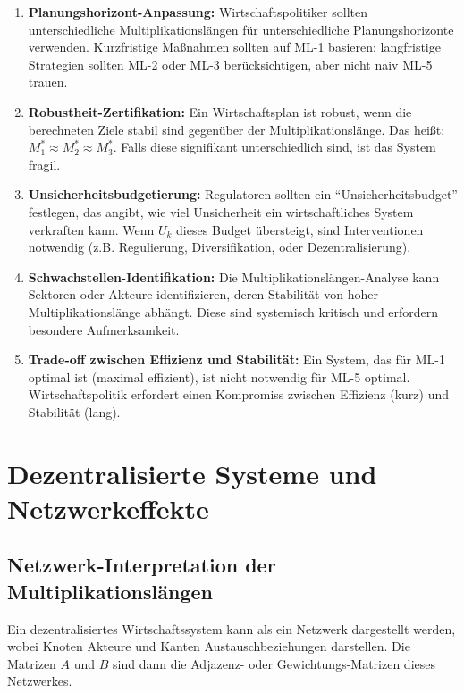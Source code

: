 \documentclass[a4paper,12pt]{article}
\theoremstyle{definition}
\begin{document}
\begin{enumerate}

\item \textbf{Planungshorizont-Anpassung:} Wirtschaftspolitiker sollten unterschiedliche Multiplikationslängen für unterschiedliche Planungshorizonte verwenden. Kurzfristige Maßnahmen sollten auf ML-1 basieren; langfristige Strategien sollten ML-2 oder ML-3 berücksichtigen, aber nicht naiv ML-5 trauen.

\item \textbf{Robustheit-Zertifikation:} Ein Wirtschaftsplan ist robust, wenn die berechneten Ziele stabil sind gegenüber der Multiplikationslänge. Das heißt: $M_1^* \approx M_2^* \approx M_3^*$. Falls diese signifikant unterschiedlich sind, ist das System fragil.

\item \textbf{Unsicherheitsbudgetierung:} Regulatoren sollten ein ``Unsicherheitsbudget'' festlegen, das angibt, wie viel Unsicherheit ein wirtschaftliches System verkraften kann. Wenn $U_k$ dieses Budget übersteigt, sind Interventionen notwendig (z.B. Regulierung, Diversifikation, oder Dezentralisierung).

\item \textbf{Schwachstellen-Identifikation:} Die Multiplikationslängen-Analyse kann Sektoren oder Akteure identifizieren, deren Stabilität von hoher Multiplikationslänge abhängt. Diese sind systemisch kritisch und erfordern besondere Aufmerksamkeit.

\item \textbf{Trade-off zwischen Effizienz und Stabilität:} Ein System, das für ML-1 optimal ist (maximal effizient), ist nicht notwendig für ML-5 optimal. Wirtschaftspolitik erfordert einen Kompromiss zwischen Effizienz (kurz) und Stabilität (lang).

\end{enumerate}

\section{Dezentralisierte Systeme und Netzwerkeffekte}

\subsection{Netzwerk-Interpretation der Multiplikationslängen}

Ein dezentralisiertes Wirtschaftssystem kann als ein Netzwerk dargestellt werden, wobei Knoten Akteure und Kanten Austauschbeziehungen darstellen. Die Matrizen $A$ und $B$ sind dann die Adjazenz- oder Gewichtungs-Matrizen dieses Netzwerkes.
\end{document}
